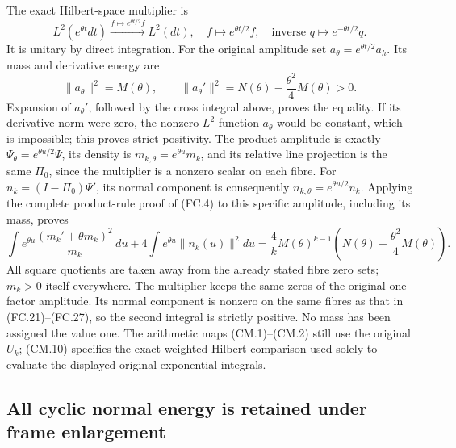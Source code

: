 The exact Hilbert-space multiplier is
\[
 L^2(e^{\theta t}dt)\xrightarrow{f\mapsto e^{\theta t/2}f}L^2(dt),
 \quad f\longmapsto e^{\theta t/2}f,
 \quad\text{inverse }q\longmapsto e^{-\theta t/2}q.
 \tag{CM.10}
\]
It is unitary by direct integration. For the original amplitude set
\(a_\theta=e^{\theta t/2}a_h\). Its mass and derivative energy are
\[
 \|a_\theta\|^2=M(\theta),\qquad
 \|a_\theta'\|^2=N(\theta)-\frac{\theta^2}{4}M(\theta)>0.
 \tag{CM.11}
\]
Expansion of \(a_\theta'\), followed by the cross integral above,
proves the equality. If its derivative norm were zero, the nonzero
\(L^2\) function \(a_\theta\) would be constant, which is impossible;
this proves strict positivity.
The product amplitude is exactly \(\Psi_\theta=e^{\theta u/2}\Psi\),
its density is \(m_{k,\theta}=e^{\theta u}m_k\), and its relative
line projection is the same \(\Pi_0\), since the multiplier is a
nonzero scalar on each fibre. For
\(n_k=(I-\Pi_0)\Psi'\), its normal component is consequently
\(n_{k,\theta}=e^{\theta u/2}n_k\).
Applying the complete product-rule proof of (FC.4) to this specific
amplitude, including its mass, proves
\[
 \boxed{
 \int e^{\theta u}\frac{(m_k'+\theta m_k)^2}{m_k}\,du
  +4\int e^{\theta u}\|n_k(u)\|^2du
  =\frac4k M(\theta)^{k-1}
             \left(N(\theta)-\frac{\theta^2}{4}M(\theta)\right).}
 \tag{CM.12}
\]
All square quotients are taken away from the already stated fibre
zero sets; \(m_k>0\) itself everywhere. The multiplier keeps the same
zeros of the original one-factor amplitude. Its normal component is
nonzero on the same fibres as that in (FC.21)--(FC.27), so the second
integral is strictly positive. No mass has been assigned the value one.
The arithmetic maps (CM.1)--(CM.2) still use the original \(U_k\);
(CM.10) specifies the exact weighted Hilbert comparison used solely
to evaluate the displayed original exponential integrals.

\subsection{All cyclic normal energy is retained under frame enlargement}

